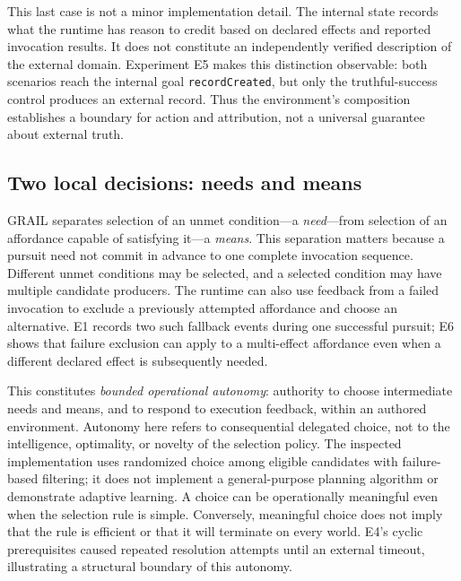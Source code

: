 \documentclass[11pt]{article}
\begin{document}
This last case is not a minor implementation detail. The internal state records what the runtime has reason to credit based on declared effects and reported invocation results. It does not constitute an independently verified description of the external domain. Experiment E5 makes this distinction observable: both scenarios reach the internal goal \texttt{recordCreated}, but only the truthful-success control produces an external record. Thus the environment's composition establishes a boundary for action and attribution, not a universal guarantee about external truth.

\subsection{Two local decisions: needs and means}
GRAIL separates selection of an unmet condition---a \emph{need}---from selection of an affordance capable of satisfying it---a \emph{means}. This separation matters because a pursuit need not commit in advance to one complete invocation sequence. Different unmet conditions may be selected, and a selected condition may have multiple candidate producers. The runtime can also use feedback from a failed invocation to exclude a previously attempted affordance and choose an alternative. E1 records two such fallback events during one successful pursuit; E6 shows that failure exclusion can apply to a multi-effect affordance even when a different declared effect is subsequently needed.

This constitutes \emph{bounded operational autonomy}: authority to choose intermediate needs and means, and to respond to execution feedback, within an authored environment. Autonomy here refers to consequential delegated choice, not to the intelligence, optimality, or novelty of the selection policy. The inspected implementation uses randomized choice among eligible candidates with failure-based filtering; it does not implement a general-purpose planning algorithm or demonstrate adaptive learning. A choice can be operationally meaningful even when the selection rule is simple. Conversely, meaningful choice does not imply that the rule is efficient or that it will terminate on every world. E4's cyclic prerequisites caused repeated resolution attempts until an external timeout, illustrating a structural boundary of this autonomy.
\end{document}
